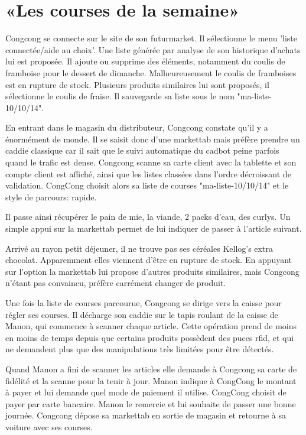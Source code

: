 \section{«Les courses de la semaine»}

Congcong se connecte sur le site de son futurmarket.
Il sélectionne le menu 'liste connectée/aide au choix'.
Une liste générée par analyse de son historique d'achats lui est proposée.
Il ajoute ou supprime des éléments, notamment du coulis de framboise pour le dessert de dimanche.
Malheureusement le coulis de framboises est en rupture de stock.
Plusieurs produits similaires lui sont proposés, il sélectionne le coulis de fraise.
Il sauvegarde sa liste sous le nom "ma-liste-10/10/14".
\par
En entrant dans le magasin du distributeur, Congcong constate qu'il y a énormément de monde.
Il se saisit donc d'une markettab mais préfère prendre un caddie classique car il sait que le suivi automatique du cadbot peine parfois quand le trafic est dense.
Congcong scanne sa carte client avec la tablette et son compte client est affiché, ainsi que les listes classées dans l'ordre décroissant de validation.
CongCong choisit alors sa liste de courses "ma-liste-10/10/14" et le style de parcours: rapide.\par
Il passe ainsi récupérer le pain de mie, la viande, 2 packs d'eau, des curlys.
Un simple appui sur la markettab permet de lui indiquer de passer à l'article suivant.
\par
Arrivé au rayon petit déjeuner, il ne trouve pas ses céréales Kellog's extra chocolat.
Apparemment elles viennent d'être en rupture de stock.
En appuyant sur l'option \type{[variante]} la markettab lui propose d'autres produits similaires, mais Congcong n'étant pas convaincu, préfère carrément changer de produit.
\par
Une fois la liste de courses parcourue, Congcong se dirige vers la caisse pour régler ses courses. 
Il décharge son caddie sur le tapis roulant de la caisse de Manon, qui commence à scanner chaque article.
Cette opération prend de moins en moins de temps depuis que certains produits possèdent des puces rfid, et qui ne demandent plus que des manipulations très limitées pour être détectés.
\par
Quand Manon a fini de scanner les articles elle demande à Congcong sa carte de fidélité et la scanne pour la tenir à jour.
Manon indique à CongCong le montant à payer et lui demande quel mode de paiement il utilise.
CongCong choisit de payer par carte bancaire. 
Manon le remercie et lui souhaite de passer une bonne journée.
Congcong dépose sa markettab en sortie de magasin et retourne à sa voiture avec ses courses.


